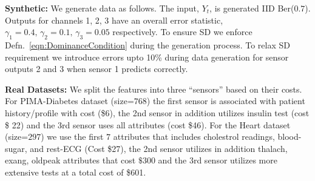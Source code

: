 \documentclass[11pt]{article} %
\newcommand{\ses}{sensor selection\xspace}
\begin{document}
{\bf Synthetic:} We generate data as follows. The input, $Y_t$, is generated IID Ber($0.7$). Outputs for channels 1, 2, 3 have an overall error statistic, $\gamma_1 = 0.4,\,\gamma_2=0.1,\,\gamma_3=0.05$ respectively. To ensure SD we enforce Defn.~\ref{eqn:DominanceCondition} during the generation process. To relax SD requirement we introduce errors upto 10\% during data generation for sensor outputs 2 and 3 when sensor 1 predicts correctly.%


{\bf Real Datasets:} %
We split the features into three ``sensors'' based on their costs. For PIMA-Diabetes dataset (size=$768$) the first sensor is associated with patient history/profile with cost (\$6), the 2nd sensor in addition utilizes  insulin test (cost \$ 22) and the 3rd sensor uses all attributes (cost \$46). For the Heart dataset (size=$297$) we use the first $7$ attributes that includes cholestrol readings, blood-sugar, and rest-ECG (Cost \$27), the 2nd sensor utilizes in addition thalach, exang, oldpeak attributes that cost $\$300$  and the 3rd sensor utilizes more extensive tests at a total cost of \$601. 
\end{document}
